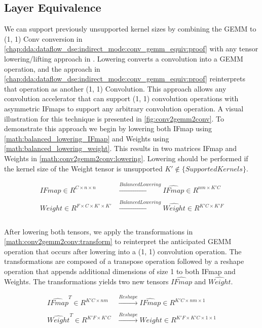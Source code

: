 \subsection{Layer Equivalence}
\label{chap:dda:dataflow_dse:indirect_mode:layer_equivelence}

We can support previously unsupported kernel sizes by combining the GEMM to (1, 1)
Conv conversion in
\autoref{chap:dda:dataflow_dse:indirect_mode:conv_gemm_equiv:proof} with any
tensor lowering/lifting approach in \cite{cafe_con_troll}. Lowering converts a
convolution into a GEMM operation, and the approach in
\autoref{chap:dda:dataflow_dse:indirect_mode:conv_gemm_equiv:proof} reinterprets
that operation as another (1, 1) Convolution. This approach allows any convolution
accelerator that can support (1, 1) convolution operations with asymmetric IFmaps
to support any arbitrary convolution operation. A visual illustration for this
technique is presented in \autoref{fig:conv2gemm2conv}. To demonstrate this
approach we begin by lowering both IFmap using
\autoref{math:balanced_lowering_IFmap} and Weights using
\autoref{math:balanced_lowering_weight}. This results in two matrices IFmap and
Weights in \autoref{math:conv2gemm2conv:lowering}. Lowering should be performed
if the kernel size of the Weight tensor is unsupported $K' \notin
\{SupportedKernels\}$. 

\begin{equation}
    \begin{aligned}
        IFmap \in R^{C\times n\times n} & \xrightarrow[]{Balanced Lowering} \hat{IFmap} \in R^{nm\times K'C} \\
        Weight \in R^{F\times C\times K' \times K'} & \xrightarrow[]{Balanced Lowering} \hat{Weight} \in R^{K'C\times K'F} \\
    \end{aligned}
    \label{math:conv2gemm2conv:lowering}
\end{equation}

After lowering both tensors, we apply the transformations in
\autoref{math:conv2gemm2conv:transform} to reinterpret the anticipated GEMM
operation that occurs after lowering into a (1, 1) convolution operation. The
transformations are composed of a transpose operation followed by a reshape
operation that appends additional dimensions of size 1 to both IFmap and
Weights. The transformations yields two new tensors $\hat{IFmap}$ and
$\hat{Weight}$.

\begin{equation}
    \begin{aligned}
        \hat{IFmap}^T \in R^{K'C \times nm} & \xrightarrow[]{Reshape} \hat{IFmap} \in R^{K'C \times nm \times 1} \\
        \hat{Weight}^T \in R^{K'F\times K'C} & \xrightarrow[]{Reshape} Weight \in R^{K'F\times K'C \times 1 \times 1} \\
        \end{aligned}
    \label{math:conv2gemm2conv:transform}
\end{equation}

